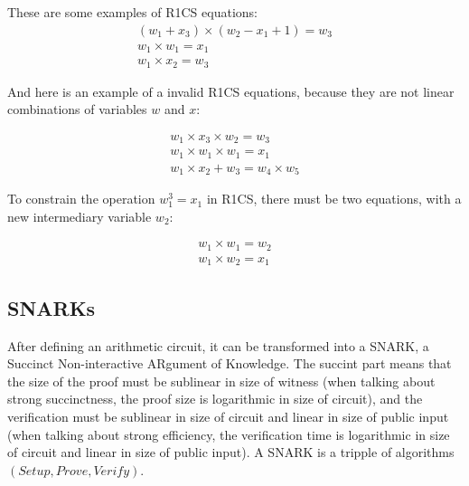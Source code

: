 \documentclass[conference,comsoc,10pt]{IEEEtran}
\begin{document}
        These are some examples of R1CS equations:
        \begin{displaymath}
            \begin{array}{l}
                (w_1 + x_3) \times (w_2 - x_1 + 1) = w_3 \\
                w_1 \times w_1 = x_1                     \\
                w_1 \times x_2 = w_3
            \end{array}
        \end{displaymath}

        And here is an example of a invalid R1CS equations, because they are not linear
        combinations of variables $w$ and $x$:

        \begin{displaymath}
            \begin{array}{l}
                w_1 \times x_3 \times w_2 = w_3 \\
                w_1 \times w_1 \times w_1 = x_1 \\
                w_1 \times x_2 + w_3 = w_4 \times w_5
            \end{array}
        \end{displaymath}

        To constrain the operation $w_1^3 = x_1$ in R1CS, there must be two equations, with
        a new intermediary variable $w_2$:

        \begin{displaymath}
            \begin{array}{l}
                w_1 \times w_1 = w_2 \\
                w_1 \times w_2 = x_1
            \end{array}
        \end{displaymath}

    \subsection{SNARKs}

        After defining an arithmetic circuit, it can be transformed into a SNARK,
        a Succinct Non-interactive ARgument of Knowledge. The succint part means that
        the size of the proof must be sublinear in size of witness (when talking about
        strong succinctness, the proof size is logarithmic in size of circuit), and
        the verification must be sublinear in size of circuit and linear in size of
        public input (when talking about strong efficiency, the verification time is
        logarithmic in size of circuit and linear in size of public input).
        A SNARK is a tripple of algorithms $(Setup, Prove, Verify)$\cite{Groth16}.
\end{document}
